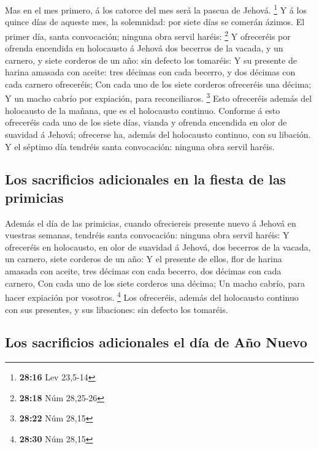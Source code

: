  Mas en el mes primero, á los catorce del mes será la
pascua de Jehová. \footnote{\textbf{28:16} Lev 23,5-14}  Y
á los quince días de aqueste mes, la solemnidad: por siete días se
comerán ázimos.  El primer día, santa convocación; ninguna
obra servil haréis: \footnote{\textbf{28:18} Núm 28,25-26} 
Y ofreceréis por ofrenda encendida en holocausto á Jehová dos becerros
de la vacada, y un carnero, y siete corderos de un año: sin defecto los
tomaréis:  Y su presente de harina amasada con aceite: tres
décimas con cada becerro, y dos décimas con cada carnero ofreceréis;
 Con cada uno de los siete corderos ofreceréis una décima;
 Y un macho cabrío por expiación, para reconciliaros.
\footnote{\textbf{28:22} Núm 28,15}  Esto ofreceréis además
del holocausto de la mañana, que es el holocausto continuo.
 Conforme á esto ofreceréis cada uno de los siete días,
vianda y ofrenda encendida en olor de suavidad á Jehová; ofrecerse ha,
además del holocausto continuo, con su libación.  Y el
séptimo día tendréis santa convocación: ninguna obra servil haréis.

\hypertarget{los-sacrificios-adicionales-en-la-fiesta-de-las-primicias}{%
\subsection{Los sacrificios adicionales en la fiesta de las
primicias}\label{los-sacrificios-adicionales-en-la-fiesta-de-las-primicias}}

 Además el día de las primicias, cuando ofreciereis
presente nuevo á Jehová en vuestras semanas, tendréis santa convocación:
ninguna obra servil haréis:  Y ofreceréis en holocausto, en
olor de suavidad á Jehová, dos becerros de la vacada, un carnero, siete
corderos de un año:  Y el presente de ellos, flor de harina
amasada con aceite, tres décimas con cada becerro, dos décimas con cada
carnero,  Con cada uno de los siete corderos una décima;
 Un macho cabrío, para hacer expiación por vosotros.
\footnote{\textbf{28:30} Núm 28,15}  Los ofreceréis, además
del holocausto continuo con sus presentes, y sus libaciones: sin defecto
los tomaréis.

\hypertarget{los-sacrificios-adicionales-el-duxeda-de-auxf1o-nuevo}{%
\subsection{Los sacrificios adicionales el día de Año
Nuevo}\label{los-sacrificios-adicionales-el-duxeda-de-auxf1o-nuevo}}

